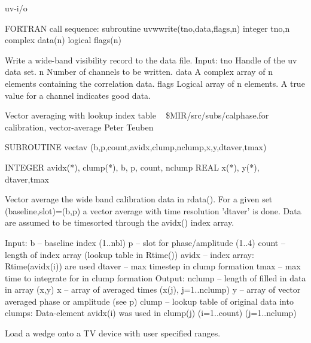 \newline {} uv-i/o
\par{\tenpoint
{\eightpoint\begintt
FORTRAN call sequence:
        subroutine uvwwrite(tno,data,flags,n)
        integer tno,n
        complex data(n)
        logical flags(n)

  Write a wide-band visibility record to the data file.
  Input:
    tno         Handle of the uv data set.
    n           Number of channels to be written.
    data        A complex array of n elements containing
                the correlation data.
    flags       Logical array of n elements. A true value for
                a channel indicates good data.                          
\endtt}
\par}
%
\noindent Vector averaging with lookup index table
\newline \ 
\newline {} \$MIR/src/subs/calphase.for
\newline {} calibration, vector-average
\newline {} Peter Teuben
\par{\tenpoint
{\eightpoint\begintt
      SUBROUTINE vectav (b,p,count,avidx,clump,nclump,x,y,dtaver,tmax)

      INTEGER avidx(*), clump(*), b, p, count, nclump
      REAL    x(*), y(*), dtaver,tmax

  Vector average the wide band calibration data in rdata(). For a
  given set (baseline,slot)=(b,p) a vector average with time
  resolution 'dtaver' is done. Data are assumed to be timesorted
  through the avidx() index array.

  Input:
     b        --  baseline index (1..nbl)
     p        --  slot for phase/amplitude (1..4)
     count    --  length of index array (lookup table in Rtime())
     avidx    --  index array: Rtime(avidx(i)) are used
     dtaver   --  max timestep in clump formation
     tmax     --  max time to integrate for in clump formation
  Output:
     nclump   --  length of filled in data in array (x,y)
     x        --  array of averaged times (x(j), j=1..nclump)
     y        --  array of vector averaged phase or amplitude (see p)
     clump    --  lookup table of original data into clumps:
                   Data-element avidx(i) was used in clump(j)
                   (i=1..count)  (j=1..nclump)
\endtt}
\par}
%
\noindent Load a wedge onto a TV device with user specified ranges.
\newline \ 
